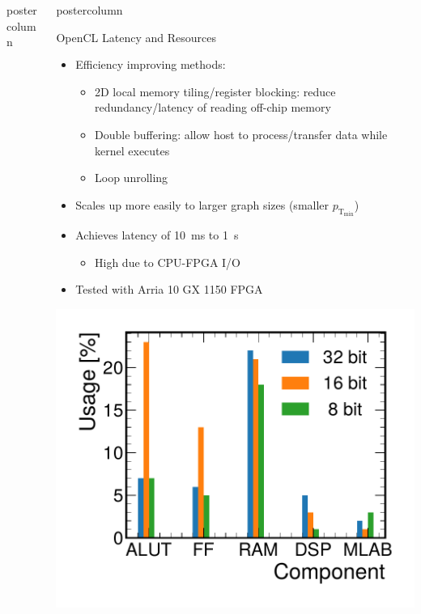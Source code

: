 \documentclass[final,hyperref={pdfpagelabels=false}]{beamer}
\newlength{\columnheight}
\newcommand{\ptmin}{\ensuremath{p_{\mathrm{T_{min}}}}\xspace}
\begin{document}
\begin{frame}
\begin{columns}
\begin{column}{.49\textwidth}
\begin{beamercolorbox}[center,wd=\textwidth]{postercolumn}
\begin{minipage}[T]{.95\textwidth}
{                }
              \end{minipage}
            \end{beamercolorbox}
          \end{column}

    \begin{column}{.49\textwidth}
      \begin{beamercolorbox}[center,wd=\textwidth]{postercolumn}
        \begin{minipage}[T]{.95\textwidth} 
          \parbox[t][\columnheight]{\textwidth}{
            
            \begin{block}{OpenCL Latency and Resources}
              \begin{itemize}
                \item Efficiency improving methods:
                \begin{itemize}
                    \item 2D local memory tiling/register blocking: reduce redundancy/latency of reading off-chip memory
                    \item Double buffering: allow host to process/transfer data while kernel executes
                    \item Loop unrolling
                \end{itemize}
                \vspace{6mm}
                \item Scales up more easily to larger graph sizes (smaller \ptmin)
                \item Achieves latency of 10~ms to 1~s
                \begin{itemize}
                    \item High due to CPU-FPGA I/O
                \end{itemize}
                \item Tested with Arria 10 GX 1150 FPGA
              \end{itemize}
              \begin{center}
                \includegraphics[width=0.33\linewidth]{figures/resource_bit_precision_ocl.pdf}

\end{center}
\end{block}}
\end{minipage}
\end{beamercolorbox}
\end{column}
\end{columns}
\end{frame}
\end{document}
